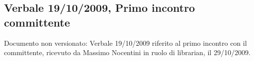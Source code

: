 \subsection{Verbale 19/10/2009, Primo incontro committente}
Documento non versionato: Verbale 19/10/2009 riferito al primo incontro con il 
committente, ricevuto da Massimo Nocentini in ruolo di librarian, il 29/10/2009. 
